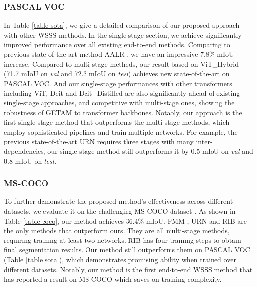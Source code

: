 \documentclass[10pt,twocolumn,letterpaper]{article}
\begin{document}
\subsubsection{PASCAL VOC}
In Table \ref{table sota}, we give a detailed comparison of our proposed approach with other WSSS methods.
In the single-stage section, 
we achieve significantly improved performance over all existing end-to-end methods. Comparing to previous state-of-the-art method AALR \cite{zhang2021adaptive}, we have an impressive 7.8\% mIoU increase.
Compared to multi-stage methods, 
our result
based on ViT\_Hybrid (71.7 mIoU on \textit{val} and 72.3 mIoU on \textit{test}) achieves new state-of-the-art on PASCAL VOC.
And our single-stage performances with other transformers including ViT, Deit and Deit\_Distilled are also significantly ahead of existing single-stage approaches, and competitive with multi-stage ones, showing the robustness of GETAM to transformer backbones.
Notably, our approach is the first single-stage method that outperforms the multi-stage methods, which employ sophisticated pipelines and train multiple networks. 
For example, the previous state-of-the-art URN \cite{li2021uncertainty} requires three stages with many inter-dependencies, our single-stage method still outperforms it by 0.5 mIoU on \textit{val} and 0.8 mIoU on \textit{test}.





\subsubsection{MS-COCO}
To further demonstrate the proposed method's effectiveness across different datasets, we evaluate it on the challenging MS-COCO dataset \cite{lin2014microsoft}.
As shown in Table \ref{table coco}, our method achieves 36.4\% mIoU. 
PMM \cite{Li_2021_ICCV}, URN \cite{li2021uncertainty} and RIB \cite{lee2021reducing} are the only methods that outperform ours. They are all multi-stage methods, requiring training at least two networks.
RIB \cite{lee2021reducing} has four training steps to obtain final segmentation results.
Our method still outperforms them on PASCAL VOC (Table \ref{table sota}), which demonstrates promising ability when trained over different datasets.
Notably, our method is the first end-to-end WSSS method that has reported a result on MS-COCO which saves on training complexity. 
\end{document}
